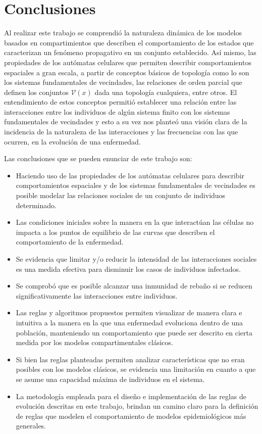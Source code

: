\chapter{Conclusiones}

Al realizar este trabajo se comprendió la naturaleza dinámica de los modelos basados en compartimientos que describen el comportamiento de los estados que caracterizan un fenómeno propagativo en un conjunto establecido. Así mismo, las propiedades de los autómatas celulares que permiten describir comportamientos espaciales a gran escala, a partir de conceptos básicos de topología como lo son los sistemas fundamentales de vecindades, las relaciones de orden parcial que definen los conjuntos $\mathcal{V}(x)$ dada una topología cualquiera, entre otros. El entendimiento de estos conceptos permitió establecer una relación entre las interacciones entre los individuos de algún sistema finito con los sistemas fundamentales de vecindades y esto a su vez nos planteó una visión clara de la incidencia de la naturaleza de las interacciones y las frecuencias con las que ocurren,
en la evolución de una enfermedad.

Las conclusiones que se pueden enunciar de este trabajo son:
\begin{itemize}
    \item Haciendo uso de las propiedades de los autómatas celulares para describir comportamientos espaciales y de los sistemas fundamentales de vecindades es posible modelar las relaciones sociales de un conjunto de individuos determinado.
    \item Las condiciones iniciales sobre la manera en la que interactúan las células no impacta a los puntos de equilibrio de las curvas que describen el comportamiento de la enfermedad.
    \item Se evidencia que limitar y/o reducir la intensidad de las interacciones sociales es una medida efectiva para disminuir los casos de individuos infectados.
    \item Se comprobó que es posible alcanzar una inmunidad de rebaño si se reducen significativamente las interacciones entre individuos.
    \item Las reglas y algoritmos propuestos permiten visualizar de manera clara e intuitiva a la manera en la que una enfermedad evoluciona dentro de una población, manteniendo un comportamiento que puede ser descrito en cierta medida por los modelos compartimentales clásicos.
    \item Si bien las reglas planteadas permiten analizar características que no eran posibles con los modelos clásicos, se evidencia una limitación en cuanto a que se asume una capacidad máxima de individuos en el sistema.
    \item La metodología empleada para el diseño e implementación de las reglas de evolución descritas en este trabajo, brindan un camino claro para la definición de reglas que modelen el comportamiento de modelos epidemiológicos más generales.
\end{itemize}